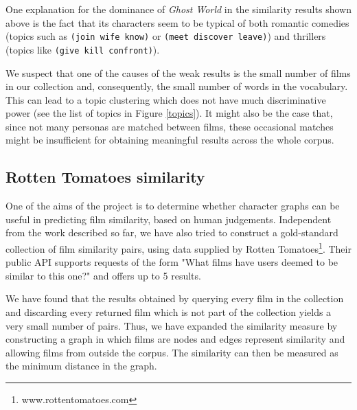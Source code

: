\documentclass[bsc,frontabs,singlespacing,parskip]{infthesis} %
\begin{document}
One explanation for the dominance of \textit{Ghost World} in the similarity results shown above is the fact that its characters seem to be typical of both romantic comedies (topics such as \texttt{(join wife know)} or \texttt{(meet discover leave)}) and thrillers (topics like \texttt{(give kill confront)}).

We suspect that one of the causes of the weak results is the small number of films in our collection and, consequently, the small number of words in the vocabulary. This can lead to a topic clustering which does not have much discriminative power (see the list of topics in Figure \ref{topics}). It might also be the case that, since not many personas are matched between films, these occasional matches might be insufficient for obtaining meaningful results across the whole corpus.

\subsection{Rotten Tomatoes similarity}
One of the aims of the project is to determine whether character graphs can be useful in predicting film similarity, based on human judgements. Independent from the work described so far, we have also tried to construct a gold-standard collection of film similarity pairs, using data supplied by Rotten Tomatoes\footnote{www.rottentomatoes.com}. Their public API supports requests of the form "What films have users deemed to be similar to this one?" and offers up to 5 results.

We have found that the results obtained by querying every film in the collection and discarding every returned film which is not part of the collection yields a very small number of pairs. Thus, we have expanded the similarity measure by constructing a graph in which films are nodes and edges represent similarity and allowing films from outside the corpus. The similarity can then be measured as the minimum distance in the graph.
\end{document}

